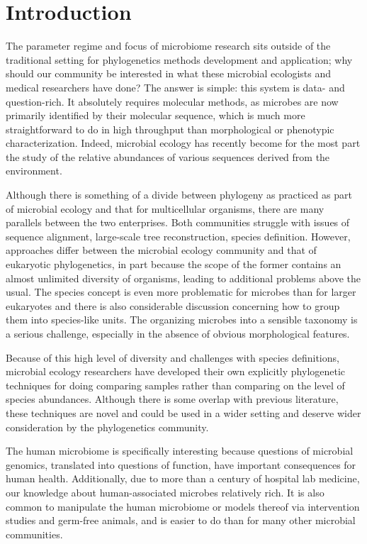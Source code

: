 \documentclass{amsart}
\begin{document}
\section{Introduction}

The parameter regime and focus of microbiome research sits outside of the traditional setting for phylogenetics methods development and application; why should our community be interested in what these microbial ecologists and medical researchers have done?
The answer is simple: this system is data- and question-rich.
It absolutely requires molecular methods, as microbes are now primarily identified by their molecular sequence, which is much more straightforward to do in high throughput than morphological or phenotypic characterization.
Indeed, microbial ecology has recently become for the most part the study of the relative abundances of various sequences derived from the environment.

Although there is something of a divide between phylogeny as practiced as part of microbial ecology and that for multicellular organisms, there are many parallels between the two enterprises.
Both communities struggle with issues of sequence alignment, large-scale tree reconstruction, species definition.
However, approaches differ between the microbial ecology community and that of eukaryotic phylogenetics, in part because the scope of the former contains an almost unlimited diversity of organisms, leading to additional problems above the usual.
The species concept is even more problematic for microbes than for larger eukaryotes and there is also considerable discussion concerning how to group them into species-like units.
The organizing microbes into a sensible taxonomy is a serious challenge, especially in the absence of obvious morphological features.

Because of this high level of diversity and challenges with species definitions, microbial ecology researchers have developed their own explicitly phylogenetic techniques for doing comparing samples rather than comparing on the level of species abundances.
Although there is some overlap with previous literature, these techniques are novel and could be used in a wider setting and deserve wider consideration by the phylogenetics community.

The human microbiome is specifically interesting because questions of microbial genomics, translated into questions of function, have important consequences for human health.
Additionally, due to more than a century of hospital lab medicine, our knowledge about human-associated microbes relatively rich.
It is also common to manipulate the human microbiome or models thereof via intervention studies and germ-free animals, and is easier to do than for many other microbial communities.
\end{document}
